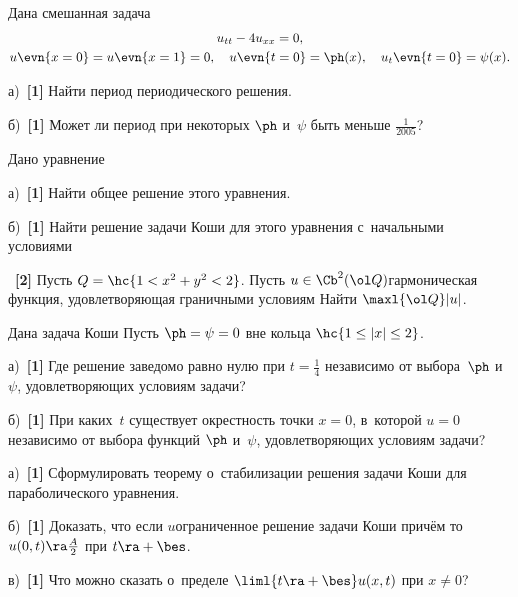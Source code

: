 \documentclass[a4paper]{article}
\def\s#1{~{\textbf{[#1]}}}
\def\nul{{\vrule width 0pt height 1pt}}
\begin{document}
\begin{problem}
Дана смешанная задача
\begin{gather*}
u_{tt}-4 u_{xx} = 0,\\
u\evn{x=0} = u\evn{x=1} = 0, \quad u\evn{t=0} = \ph(x), \quad u_t\evn{t=0} = \psi(x).
\end{gather*}

а)\s1 Найти период периодического решения.

б)\s1 Может ли период при некоторых $\ph$ и~$\psi$ быть меньше $\frac1{2005}$?
\end{problem}


\begin{problem}
Дано уравнение

а)\s1 Найти общее решение этого уравнения.

б)\s1 Найти решение задачи Коши для этого уравнения с~начальными условиями
\end{problem}

\begin{problem}

\nul\phantom{б)}\s2 Пусть $Q = \hc{1 < x^2 + y^2 < 2}$. Пусть $u \in \Cb^2(\ol Q)$\т гармоническая функция,
удовлетворяющая граничными условиям
Найти $\maxl{\ol Q} |u|$.
\end{problem}

\begin{problem}
Дана задача Коши
Пусть $\ph = \psi = 0$ вне кольца $\hc{1 \le |x| \le 2}$.

а)\s1 Где решение заведомо равно нулю при $t = \frac14$ независимо от выбора~$\ph$ и~$\psi$,
удовлетворяющих условиям задачи?

б)\s1 При каких~$t$ существует окрестность точки $x = 0$, в~которой $u = 0$ независимо от выбора
функций $\ph$ и~$\psi$, удовлетворяющих условиям задачи?
\end{problem}

\begin{problem}

а)\s1 Сформулировать теорему о~стабилизации решения задачи Коши для параболического уравнения.

б)\s1 Доказать, что если $u$\т ограниченное решение задачи Коши
причём
то $u(0,t) \ra \frac{A}{2}$ при $t \ra+\bes$.

в)\s1 Что можно сказать о~пределе $\liml{t\ra+\bes} u(x,t)$ при $x \neq 0$?
\end{problem}
\end{document}
